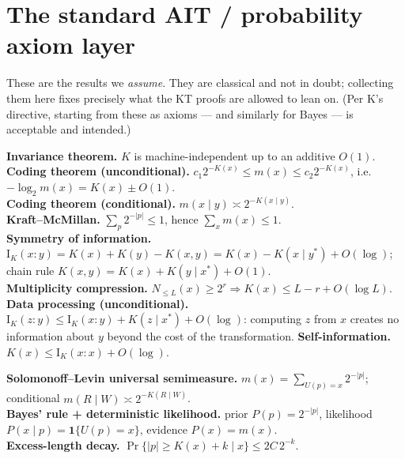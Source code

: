 \documentclass[11pt,a4paper]{article}
\newcommand{\Ik}{\mathrm{I}_K}
\begin{document}
\section{The standard AIT / probability axiom layer}
\label{sec:axioms}

These are the results we \emph{assume}. They are classical and not in doubt; collecting them here
fixes precisely what the KT proofs are allowed to lean on. (Per K's directive, starting from these
as axioms --- and similarly for Bayes --- is acceptable and intended.)

\begin{defbox}
\textbf{Invariance theorem.} $K$ is machine-independent up to an additive $O(1)$.\\
\textbf{Coding theorem (unconditional).} $c_1 2^{-K(x)}\le m(x)\le c_2 2^{-K(x)}$, i.e.
$-\log_2 m(x)=K(x)\pm O(1)$.\\
\textbf{Coding theorem (conditional).} $m(x\mid y)\asymp 2^{-K(x\mid y)}$.\\
\textbf{Kraft--McMillan.} $\sum_p 2^{-|p|}\le 1$, hence $\sum_x m(x)\le 1$.\\
\textbf{Symmetry of information.} $\Ik(x{:}y)=K(x)+K(y)-K(x,y)=K(x)-K(x\mid y^\ast)+O(\log)$;
chain rule $K(x,y)=K(x)+K(y\mid x^\ast)+O(1)$.\\
\textbf{Multiplicity compression.} $N_{\le L}(x)\ge 2^r \Rightarrow K(x)\le L-r+O(\log L)$.\\
\textbf{Data processing (unconditional).} $\Ik(z{:}y)\le\Ik(x{:}y)+K(z\mid x^\ast)+O(\log)$:
computing $z$ from $x$ creates no information about $y$ beyond the cost of the transformation.
\textbf{Self-information.} $K(x)\le\Ik(x{:}x)+O(\log)$.
\end{defbox}

\begin{defbox}
\textbf{Solomonoff--Levin universal semimeasure.} $m(x)=\sum_{U(p)=x}2^{-|p|}$; conditional
$m(R\mid W)\asymp 2^{-K(R\mid W)}$.\\
\textbf{Bayes' rule + deterministic likelihood.} prior $P(p)=2^{-|p|}$, likelihood
$P(x\mid p)=\mathbf{1}\{U(p)=x\}$, evidence $P(x)=m(x)$.\\
\textbf{Excess-length decay.} $\Pr\{|p|\ge K(x)+k \mid x\}\le 2C\,2^{-k}$.
\end{defbox}
\end{document}

